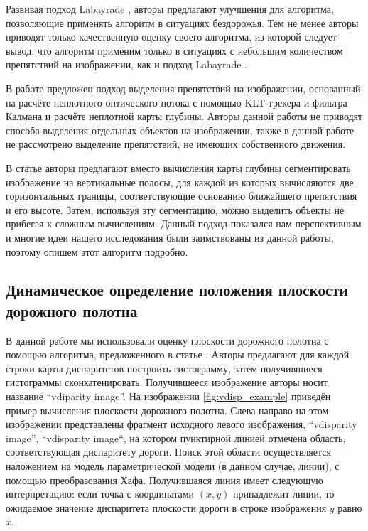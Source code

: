 \documentclass[aps,%
14pt,%
final,%
oneside,
onecolumn,%
musixtex, %
superscriptaddress,%
centertags]{extarticle} %
\begin{document}
Развивая подход Labayrade \cite{labayrade2002real}, авторы \cite{broggi2006single} предлагают улучшения для алгоритма, позволяющие применять алгоритм в ситуациях бездорожья. Тем не менее авторы приводят только качественную оценку своего алгоритма, из которой следует вывод, что алгоритм применим только в ситуациях с небольшим количеством препятствий на изображении, как и подход Labayrade  \cite{labayrade2002real}.

В работе \cite{franke20056d} предложен подход выделения препятствий на изображении, основанный на расчёте неплотного оптического потока с помощью KLT-трекера и фильтра Калмана и расчёте неплотной карты глубины. Авторы данной работы не приводят способа выделения отдельных объектов на изображении, также в данной работе не рассмотрено выделение препятствий, не имеющих собственного движения.

В статье \cite{pfeiffer2010efficient} авторы предлагают вместо вычисления карты глубины сегментировать изображение на вертикальные полосы, для каждой из которых вычисляются две горизонтальных границы, соответствующие основанию ближайшего препятствия и его высоте. Затем, используя эту сегментацию, можно выделить объекты не прибегая к сложным вычислениям. Данный подход показался нам перспективным и многие идеи нашего исследования были заимствованы из данной работы, поэтому опишем этот алгоритм подробно.


\subsection{Динамическое определение положения плоскости дорожного полотна}\label{vdisparity_explanation}

В данной работе мы использовали оценку плоскости дорожного полотна с помощью алгоритма, предложенного в статье \cite{labayrade2002real}. Авторы предлагают для каждой строки карты диспаритетов построить гистограмму, затем получившиеся гистограммы сконкатенировать. Получившееся изображение авторы носит название ``vdiparity image''. На изображении \ref{fig:vdisp_example} приведён пример вычисления плоскости дорожного полотна. Слева направо на этом изображении представлены фрагмент исходного левого изображения, ``vdisparity image'', ``vdisparity image``, на котором пунктирной линией отмечена область, соответствующая диспаритету дороги. Поиск этой области осуществляется наложением на модель параметрической модели (в данном случае, линии), с помощью преобразования Хафа. Получившаяся линия имеет следующую интерпретацию: если точка с координатами $(x, y)$ принадлежит линии, то ожидаемое значение диспаритета плоскости дороги в строке изображения $y$ равно $x$.
\end{document}
